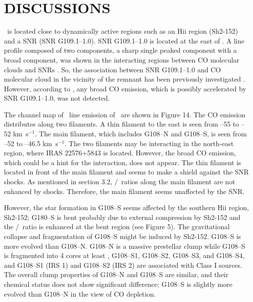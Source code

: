 \documentclass[manuscript]{aastex}
\begin{document}
\section{DISCUSSIONS}

\sou\ is located close to dynamically active regions such as an H{\sc ii} region (Sh2-152) and a SNR (SNR G109.1--1.0).
SNR G109.1--1.0 is located at the east of \sou.
A line profile composed of two components, a sharp single peaked component with a broad component, was shown in the interacting regions between CO molecular clouds and SNRs \citep{seta98,su14}.
So, the association between SNR G109.1--1.0 and CO molecular cloud in the vicinity of the remnant has been previously investigated \citep{tatematsu87,tatematsu90}.
However, according to \citet{tatematsu90}, any broad CO emission, which is possibly accelerated by SNR G109.1--1.0, was not detected.


The channel map of \tco\ line emission of \sou\ are shown in Figure 14. 
The CO emission distributes along two filaments. 
A thin filament to the east is seen from --55 to --52 km~s$^{-1}$. 
The main filament, which includes G108--N and G108--S, is seen from --52 to --46.5 km~s$^{-1}$. 
The two filaments may be interacting in the north-east region, where IRAS 22576+5843 is located. 
However, the broad CO emission, which could be a hint for the interaction, does not appear. 
The thin filament is located in front of the main filament and seems to make a shield against the SNR shocks. 
As mentioned in section 3.2, \tcot$/$\tco\ ratios along the main filament are not enhanced by shocks. 
Therefore, the main filament seems unaffected by the SNR. 


However, the star formation in G108--S seems affected by the southern H{\sc ii} region, Sh2-152; G180--S is bent probably due
to external compression by Sh2-152 and the \tcot$/$\tco\ ratio is enhanced at the bent region (see Figure 5). 
The gravitational collapse and fragmentation of G108--S might be induced by Sh2-152.
G108--S is more evolved than G108--N.
G108--N is a massive prestellar clump while G108--S is fragmented into 4 cores  at least , G108--S1, G108--S2, G108--S3, and G108--S4, and G108--S1 (IRS 1) and G108--S2 (IRS 2) are associated with Class I sources.
The overall clump properties of G108--N and G108--S are similar, and their chemical status does not show significant difference; G108--S is slightly more evolved than G108--N in the view of CO depletion. 
\end{document}
